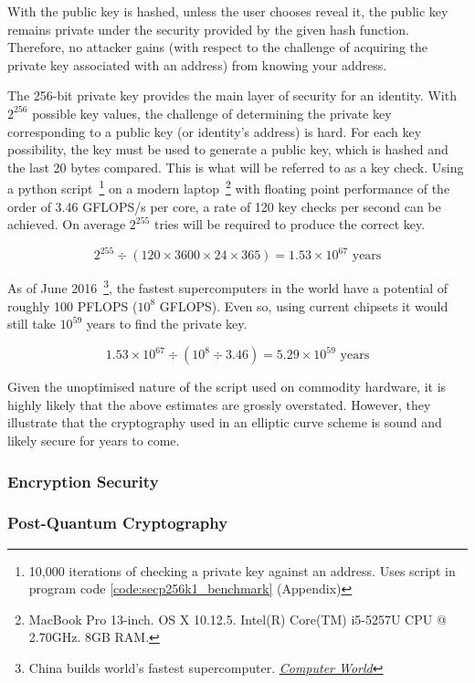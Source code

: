 With the public key is hashed, unless the user chooses reveal it, the public key remains private under the security provided by the given hash function. Therefore, no attacker gains (with respect to the challenge of acquiring the private key associated with an address) from knowing your address.

The 256-bit private key provides the main layer of security for an identity. With $2^{256}$ possible key values, the challenge of determining the private key corresponding to a public key (or identity's address) is hard. For each key possibility, the key must be used to generate a public key, which is hashed and the last 20 bytes compared. This is what will be referred to as a key check. Using a python script~\footnote{10,000 iterations of checking a private key against an address. Uses script in program code \ref{code:secp256k1_benchmark} (Appendix)} on a modern laptop~\footnote{MacBook Pro 13-inch. OS X 10.12.5. Intel(R) Core(TM) i5-5257U CPU @ 2.70GHz. 8GB RAM.} with floating point performance of the order of 3.46 GFLOPS/s per core, a rate of 120 key checks per second can be achieved. On average $2^{255}$ tries will be required to produce the correct key.

$$
2^{255} \div (120 \times 3600 \times 24 \times 365) = 1.53 \times 10^{67} \text{ years}
$$

As of June 2016~\footnote{China builds world's fastest supercomputer.  \href{http://www.computerworld.com/article/3085483/high-performance-computing/china-builds-world-s-fastest-supercomputer-without-u-s-chips.html}{\textit{Computer World}}}, the fastest supercomputers in the world have a potential of roughly 100 PFLOPS ($10^8$ GFLOPS). Even so, using current chipsets it would still take $10^{59}$ years to find the private key.

$$
1.53 \times 10^{67} \div (10^8 \div 3.46) = 5.29 \times 10^{59} \text{ years}
$$

Given the unoptimised nature of the script used on commodity hardware, it is highly likely that the above estimates are grossly overstated. However, they illustrate that the cryptography used in an elliptic curve scheme is sound and likely secure for years to come.

\subsubsection{Encryption Security}

\subsubsection{Post-Quantum Cryptography}





